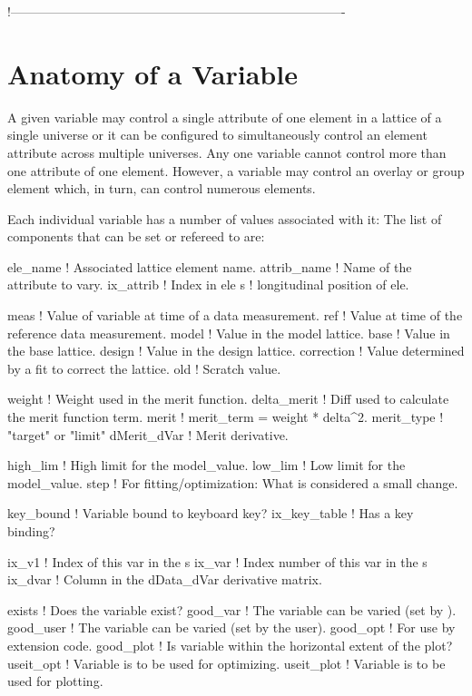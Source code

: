 !-------------------------------------------------------------------------------
\section{Anatomy of a Variable}
\label{s:var.anatomy}

A given variable may control a single attribute of one element in a  lattice of a single
universe or it can be configured to simultaneously control an element attribute across multiple
universes. Any one variable cannot control more than one attribute of one element. However, a
variable may control an overlay or group element which, in turn, can control numerous elements.

Each individual variable has a number of values associated with it: The list of components that can
be set or refereed to are:
\begin{example}
  ele_name     ! Associated lattice element name.
  attrib_name  ! Name of the attribute to vary.
  ix_attrib    ! Index in ele%
  s            ! longitudinal position of ele.

  meas         ! Value of variable at time of a data measurement.
  ref          ! Value at time of the reference data measurement.
  model        ! Value in the model lattice.
  base         ! Value in the base lattice.
  design       ! Value in  the design lattice.
  correction   ! Value determined by a fit to correct the lattice.
  old          ! Scratch value.

  weight       ! Weight used in the merit function.
  delta_merit  ! Diff used to calculate the merit function term.
  merit        ! merit_term = weight * delta^2.
  merit_type   ! "target" or "limit"
  dMerit_dVar  ! Merit derivative.

  high_lim     ! High limit for the model_value.
  low_lim      ! Low limit for the model_value.
  step         ! For fitting/optimization: What is considered a small change.

  key_bound    ! Variable bound to keyboard key?
  ix_key_table ! Has a key binding?

  ix_v1        ! Index of this var in the s%
  ix_var       ! Index number of this var in the s%
  ix_dvar      ! Column in the dData_dVar derivative matrix.

  exists       ! Does the variable exist?
  good_var     ! The variable can be varied (set by \tao).
  good_user    ! The variable can be varied (set by the user).
  good_opt     ! For use by extension code.
  good_plot    ! Is variable within the horizontal extent of the plot? 
  useit_opt    ! Variable is to be used for optimizing.
  useit_plot   ! Variable is to be used for plotting.
\end{example}

